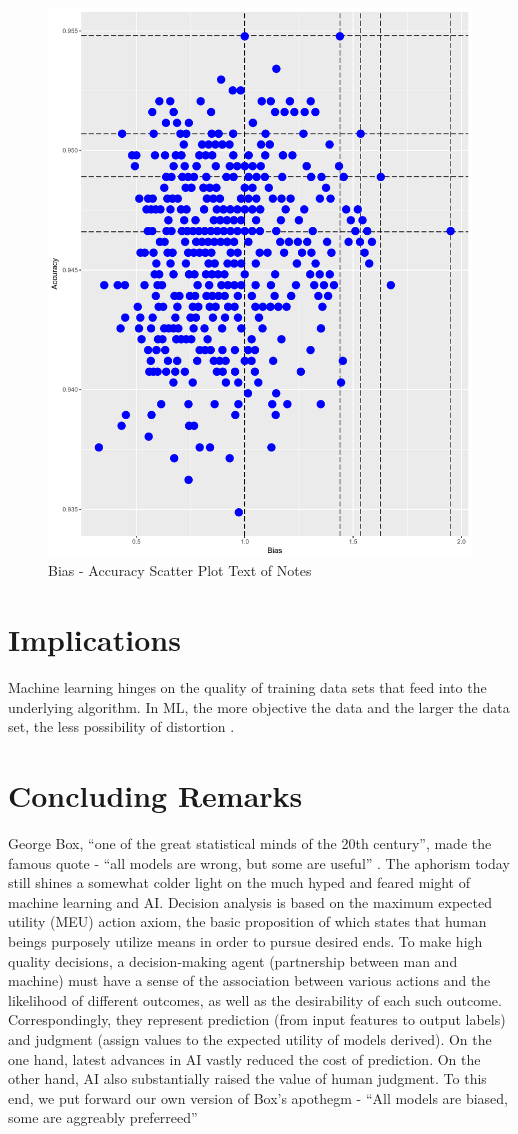 \documentclass[deca,nonblindrev]{informs3} %
\begin{document}
\begin{figure}
\FIGURE
{\includegraphics[width=0.55\linewidth]{Rplot04.pdf}}
{Bias - Accuracy Scatter Plot \label{fig1}}
{Text of Notes}
\end{figure}



\section{Implications}

Machine learning hinges  on the quality of training data sets that feed into the underlying algorithm.  In ML,  the more objective the data and the larger the data set, the less possibility of distortion \citep{Rosso2015}.

\section {Concluding Remarks}

George Box, ``one of the great statistical minds of the 20th century'',  made the famous quote - ``all models are wrong, but some are useful'' \citep[p. 424]{box1987empirical}.  The aphorism today still shines a somewhat colder light on the much hyped and feared might of machine learning and AI. Decision analysis is  based on the maximum expected utility (MEU) action axiom, the basic proposition of which states that  human beings purposely utilize means in order to pursue  desired ends. To make high quality decisions, a decision-making agent (partnership between man and machine)  must have a sense of the association between various actions and the likelihood of different outcomes, as well as the desirability of each such outcome. Correspondingly, they represent prediction (from input features to output labels) and judgment (assign values to the expected utility of models derived). On the one hand,  latest advances in AI vastly  reduced the cost of prediction. On the other hand, AI also substantially raised the value of human judgment. To this end, we put forward our own version of Box's apothegm -    ``All models are biased, some are aggreably  preferreed''
\end{document}
